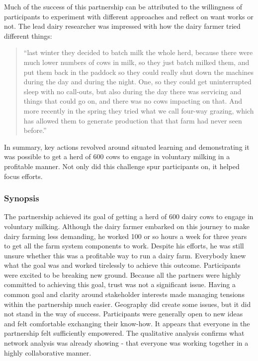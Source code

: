 Much of the success of this partnership can be attributed to the willingness of participants to experiment with different approaches and reflect on want works or not. The lead dairy researcher was impressed with how the dairy farmer tried different things:

\begin{quote}
\small
\enquote{last winter they decided to batch milk the whole herd, because there were much lower numbers of cows in milk, so they just batch milked them, and put them back in the paddock so they could really shut down the machines during the day and during the night. One, so they could get uninterrupted sleep with no call-outs, but also during the day there was servicing and things that could go on, and there was no cows impacting on that. And more recently in the spring they tried what we call four-way grazing, which has allowed them to generate production that that farm had never seen before.} \\
\end{quote}

In summary, key actions revolved around situated learning and demonstrating it was possible to get a herd of 600 cows to engage in voluntary milking in a profitable manner. Not only did this challenge spur participants on, it helped focus efforts. 

\subsubsection{Synopsis}

The partnership achieved its goal of getting a herd of 600 dairy cows to engage in voluntary milking. Although the dairy farmer embarked on this journey to make dairy farming less demanding, he worked 100 or so hours a week for three years to get all the farm system components to work. Despite his efforts, he was still unsure whether this was a profitable way to run a dairy farm. Everybody knew what the goal was and worked tirelessly to achieve this outcome. Participants were excited to be breaking new ground. Because all the partners were highly committed to achieving this goal, trust was not a significant issue. Having a common goal and clarity around stakeholder interests made managing tensions within the partnership much easier. Geography did create some issues, but it did not stand in the way of success. Participants were generally open to new ideas and felt comfortable exchanging their know-how. It appears that everyone in the partnership felt sufficiently empowered. The qualitative analysis confirms what network analysis was already showing - that everyone was working together in a highly collaborative manner. 

